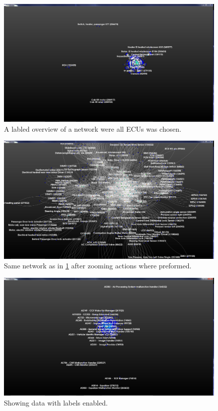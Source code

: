 \documentclass[a4paper,11pt]{kth-mag}
\begin{document}
\begin{figure}[!htbp]
	\centering
	\includegraphics[scale=0.3]{SesammVisualAppPics/2D-View/Labled/ECU/AllaECU1}
	\caption{A labled overview of a network were all ECUs was chosen.}
	\label{fig:AllaECU1TwoD}
\end{figure}

\begin{figure}[!htbp]
	\centering
	\includegraphics[scale=0.3]{SesammVisualAppPics/2D-View/Labled/ECU/AllaECU3}
	\caption{Same network as in \ref{fig:AllaECU1TwoD} after zooming actions where preformed.}
	\label{fig:AllaECU3TwoD}
\end{figure}

\newpage
 \begin{figure}[!htbp]
	\centering
	\includegraphics[scale=0.3]{SesammVisualAppPics/2D-View/Labled/AE/2D-View1}
	\caption{Showing data with labels enabled.}
	\label{fig:AllaAesTwoDLabeled}
\end{figure}
\end{document}
